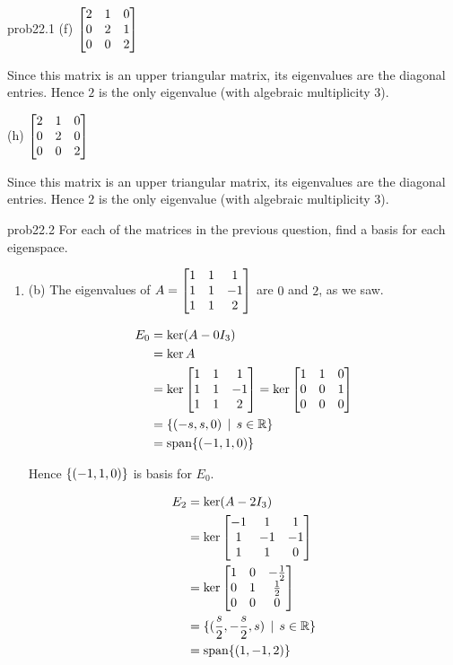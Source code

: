 \begin{sol}{prob22.1}
(f) $\bmatrix 
2&1&0\\0&2&1\\0&0&2 \endbmatrix $

\soln Since this matrix is an upper triangular matrix, its eigenvalues are the diagonal entries. Hence $2$ is the only eigenvalue (with algebraic multiplicity $3$).
\medskip

(h) $\bmatrix 
2&1&0\\0&2&0\\0&0&2 \endbmatrix $

\soln Since this matrix is an upper triangular matrix, its eigenvalues are the diagonal entries. Hence $2$ is the only eigenvalue (with algebraic multiplicity $3$).
\medskip


\end{sol}\begin{sol}{prob22.2}
For each of the matrices in the previous question, find a basis for each eigenspace.

\soln 

\begin{enumerate}[]
\item (b) The eigenvalues of $A=\bmatrix 
1&1&1\\1&1&-1\\1&1&2 \endbmatrix $ are $0$ and $2$, as we saw.  

\begin{align*}E_0&=\ker(A-0I_3)\\
&=\ker A\\
&=\ker\bmatrix 
1&1&1\\1&1&-1\\1&1&2 \endbmatrix =\ker \bmatrix 
 1 & 1 & 0 \\
 0 & 0 & 1 \\
 0 & 0 & 0 \endbmatrix\\
& =\set{(-s,s,0)\st s\in \R}\\
&=\spn\{(-1,1,0)\} \end{align*}

 Hence $\{(-1,1,0) \} $ is basis for $E_0$.
\smallskip

\begin{align*}
E_2&=\ker(A-2I_3)\\
& =\ker\bmatrix 
-1&1&1\\1&-1&-1\\1&1&0 \endbmatrix \\
&=\ker \bmatrix 
 1 & 0 & -\frac{1}{2} \\
 0 & 1 & \frac{1}{2} \\
 0 & 0 & 0 \endbmatrix \\
&=\set{(\frac{s}2,-\frac{s}2,s)\st s\in \R}\\
&=\spn\{(1,-1,2)\}\end{align*}
 

\end{enumerate}
\end{sol}
